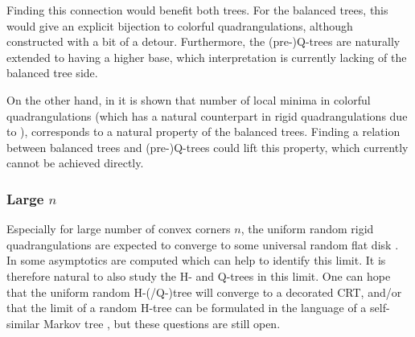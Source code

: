 \documentclass[11pt]{article}
\theoremstyle{plain}
\theoremstyle{definition}
\begin{document}
Finding this connection would benefit both trees. 
For the balanced trees, this would give an explicit bijection to colorful quadrangulations, although constructed with a bit of a detour. 
Furthermore, the (pre-)Q-trees are naturally extended to having a higher base, which interpretation is currently lacking of the balanced tree side.

On the other hand, in \cite{Bousquetmelou2025refinedenumerationplanareulerian} it is shown that number of local minima in colorful quadrangulations (which has a natural counterpart in rigid quadrangulations due to \cite{Budd_rectilinear_2025}), corresponds to a natural property of the balanced trees. 
Finding a relation between balanced trees and (pre-)Q-trees could lift this property, which currently cannot be achieved directly.

\subsubsection*{Large \texorpdfstring{$n$}{n}}

Especially for large number of convex corners $n$, the uniform random rigid quadrangulations are expected to converge to some universal random flat disk \cite{Ferrari_Random_Disk_overview_2025,Ferrari_Random_Disk_lattice_2024}. 
In \cite{Budd_rectilinear_2025} some asymptotics are computed which can help to identify this limit.
It is therefore natural to also study the H- and Q-trees in this limit. 
One can hope that the uniform random H-(/Q-)tree will converge to a decorated CRT, and/or that the limit of a random H-tree can be formulated in the language of a self-similar Markov tree \cite{Bertoin_SSMT_2024}, but these questions are still open.

\clearpage

	
\end{document}
